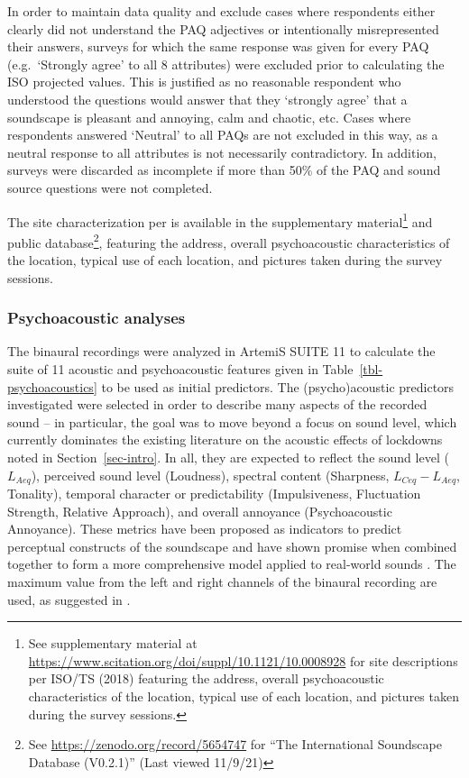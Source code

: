 \documentclass[
  authoryear,
  preprint,
  3p,
  onecolumn]{elsarticle}
\begin{document}
In order to maintain data quality and exclude cases where respondents
either clearly did not understand the PAQ adjectives or intentionally
misrepresented their answers, surveys for which the same response was
given for every PAQ (e.g.~`Strongly agree' to all 8 attributes) were
excluded prior to calculating the ISO projected values. This is
justified as no reasonable respondent who understood the questions would
answer that they `strongly agree' that a soundscape is pleasant and
annoying, calm and chaotic, etc. Cases where respondents answered
`Neutral' to all PAQs are not excluded in this way, as a neutral
response to all attributes is not necessarily contradictory. In
addition, surveys were discarded as incomplete if more than 50\% of the
PAQ and sound source questions were not completed.

The site characterization per \citet{ISO12913Part2} is available in the
supplementary material\footnote{See supplementary material at
  \url{https://www.scitation.org/doi/suppl/10.1121/10.0008928} for site
  descriptions per ISO/TS (2018) featuring the address, overall
  psychoacoustic characteristics of the location, typical use of each
  location, and pictures taken during the survey sessions.} and public
database\footnote{See \url{https://zenodo.org/record/5654747} for ``The
  International Soundscape Database (V0.2.1)'' (Last viewed 11/9/21)},
featuring the address, overall psychoacoustic characteristics of the
location, typical use of each location, and pictures taken during the
survey sessions.

\subsubsection{Psychoacoustic
analyses}\label{sec-psychoacousticAnalysis}

The binaural recordings were analyzed in ArtemiS SUITE 11 to calculate
the suite of 11 acoustic and psychoacoustic features given in
Table~\ref{tbl-psychoacoustics} to be used as initial predictors. The
(psycho)acoustic predictors investigated were selected in order to
describe many aspects of the recorded sound -- in particular, the goal
was to move beyond a focus on sound level, which currently dominates the
existing literature on the acoustic effects of lockdowns noted in
Section~\ref{sec-intro}. In all, they are expected to reflect the sound
level (\(L_{Aeq}\)), perceived sound level (Loudness), spectral content
(Sharpness, \(L_{Ceq}-L_{Aeq}\), Tonality), temporal character or
predictability (Impulsiveness, Fluctuation Strength, Relative Approach),
and overall annoyance (Psychoacoustic Annoyance). These metrics have
been proposed as indicators to predict perceptual constructs of the
soundscape \citep{Aletta2016Soundscape, Aletta2017Dimensions} and have
shown promise when combined together to form a more comprehensive model
applied to real-world sounds \citep{Orga2021Multilevel}. The maximum
value from the left and right channels of the binaural recording are
used, as suggested in \citet{ISO12913Part3}.
\end{document}

